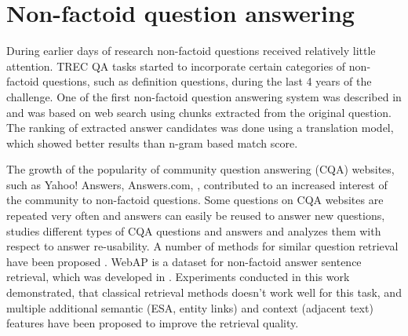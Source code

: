 


\section{Non-factoid question answering}
\label{sec:rel_work:nonfactoid}

During earlier days of research non-factoid questions received relatively little attention.
TREC QA tasks started to incorporate certain categories of non-factoid questions, such as definition questions, during the last 4 years of the challenge.
One of the first non-factoid question answering system was described in \cite{soricut2006automatic} and was based on web search using chunks extracted from the original question.
The ranking of extracted answer candidates was done using a translation model, which showed better results than n-gram based match score.

The growth of the popularity of community question answering (CQA) websites, such as Yahoo! Answers, Answers.com, \etc, contributed to an increased interest of the community to non-factoid questions.
Some questions on CQA websites are repeated very often and answers can easily be reused to answer new questions, \cite{Liu:2008:USA:1599081.1599144} studies different types of CQA questions and answers and analyzes them with respect to answer re-usability.
A number of methods for similar question retrieval have been proposed \cite{bernhard2009combining,Shtok:2012:LPA:2187836.2187939,duan2008searching,Jeon:2005:FSQ:1099554.1099572}.
WebAP is a dataset for non-factoid answer sentence retrieval, which was developed in \cite{yang2016beyond}.
Experiments conducted in this work demonstrated, that classical retrieval methods doesn't work well for this task, and multiple additional semantic (ESA, entity links) and context (adjacent text) features have been proposed to improve the retrieval quality.

